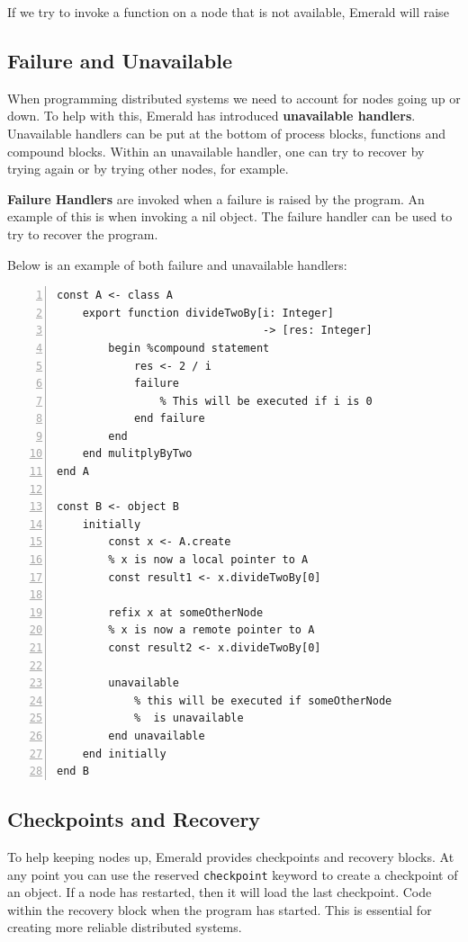 If we try to invoke a function on a node that is not available, Emerald will raise 




\subsection{Failure and Unavailable}
When programming distributed systems we need to account for nodes going up or down. To help with this, Emerald has introduced \textbf{unavailable handlers}. Unavailable handlers can be put at the bottom of process blocks, functions and compound blocks. Within an unavailable handler, one can try to recover by trying again or by trying other nodes, for example.

\textbf{Failure Handlers} are invoked when a failure is raised by the program. An example of this is when invoking a nil object. The failure handler can be used to try to recover the program.

Below is an example of both failure and unavailable handlers:
\begin{lstlisting}[language=emerald, numbers=left]
const A <- class A
    export function divideTwoBy[i: Integer] 
                                -> [res: Integer]
        begin %compound statement
            res <- 2 / i
            failure
                % This will be executed if i is 0
            end failure
        end
    end mulitplyByTwo
end A

const B <- object B
    initially
        const x <- A.create
        % x is now a local pointer to A
        const result1 <- x.divideTwoBy[0]
        
        refix x at someOtherNode
        % x is now a remote pointer to A
        const result2 <- x.divideTwoBy[0]
        
        unavailable
            % this will be executed if someOtherNode
            %  is unavailable
        end unavailable
    end initially
end B
\end{lstlisting}






\subsection{Checkpoints and Recovery}
To help keeping nodes up, Emerald provides checkpoints and recovery blocks. At any point you can use the reserved \verb|checkpoint| keyword to create a checkpoint of an object. If a node has restarted, then it will load the last checkpoint. Code within the recovery block when the program has started. This is essential for creating more reliable distributed systems.



